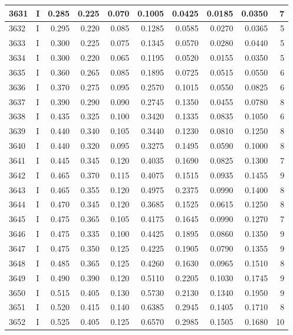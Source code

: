 \documentclass[9pt,twocolumn,twoside,]{pnas-new}
\begin{document}
\begin{tabular}{l|l|r|r|r|r|r|r|r|r}
\hline
3631 & I & 0.285 & 0.225 & 0.070 & 0.1005 & 0.0425 & 0.0185 & 0.0350 & 7\\
\hline
3632 & I & 0.295 & 0.220 & 0.085 & 0.1285 & 0.0585 & 0.0270 & 0.0365 & 5\\
\hline
3633 & I & 0.300 & 0.225 & 0.075 & 0.1345 & 0.0570 & 0.0280 & 0.0440 & 5\\
\hline
3634 & I & 0.300 & 0.220 & 0.065 & 0.1195 & 0.0520 & 0.0155 & 0.0350 & 5\\
\hline
3635 & I & 0.360 & 0.265 & 0.085 & 0.1895 & 0.0725 & 0.0515 & 0.0550 & 6\\
\hline
3636 & I & 0.370 & 0.275 & 0.095 & 0.2570 & 0.1015 & 0.0550 & 0.0825 & 6\\
\hline
3637 & I & 0.390 & 0.290 & 0.090 & 0.2745 & 0.1350 & 0.0455 & 0.0780 & 8\\
\hline
3638 & I & 0.435 & 0.325 & 0.100 & 0.3420 & 0.1335 & 0.0835 & 0.1050 & 6\\
\hline
3639 & I & 0.440 & 0.340 & 0.105 & 0.3440 & 0.1230 & 0.0810 & 0.1250 & 8\\
\hline
3640 & I & 0.440 & 0.320 & 0.095 & 0.3275 & 0.1495 & 0.0590 & 0.1000 & 8\\
\hline
3641 & I & 0.445 & 0.345 & 0.120 & 0.4035 & 0.1690 & 0.0825 & 0.1300 & 7\\
\hline
3642 & I & 0.465 & 0.370 & 0.115 & 0.4075 & 0.1515 & 0.0935 & 0.1455 & 9\\
\hline
3643 & I & 0.465 & 0.355 & 0.120 & 0.4975 & 0.2375 & 0.0990 & 0.1400 & 8\\
\hline
3644 & I & 0.470 & 0.345 & 0.120 & 0.3685 & 0.1525 & 0.0615 & 0.1250 & 8\\
\hline
3645 & I & 0.475 & 0.365 & 0.105 & 0.4175 & 0.1645 & 0.0990 & 0.1270 & 7\\
\hline
3646 & I & 0.475 & 0.335 & 0.100 & 0.4425 & 0.1895 & 0.0860 & 0.1350 & 9\\
\hline
3647 & I & 0.475 & 0.350 & 0.125 & 0.4225 & 0.1905 & 0.0790 & 0.1355 & 9\\
\hline
3648 & I & 0.485 & 0.365 & 0.125 & 0.4260 & 0.1630 & 0.0965 & 0.1510 & 8\\
\hline
3649 & I & 0.490 & 0.390 & 0.120 & 0.5110 & 0.2205 & 0.1030 & 0.1745 & 9\\
\hline
3650 & I & 0.515 & 0.405 & 0.130 & 0.5730 & 0.2130 & 0.1340 & 0.1950 & 9\\
\hline
3651 & I & 0.520 & 0.415 & 0.140 & 0.6385 & 0.2945 & 0.1405 & 0.1710 & 8\\
\hline
3652 & I & 0.525 & 0.405 & 0.125 & 0.6570 & 0.2985 & 0.1505 & 0.1680 & 10\\

\end{tabular}
\end{document}
